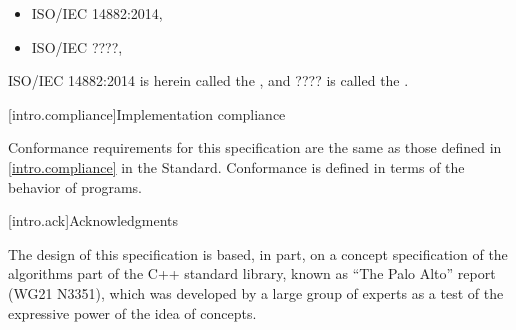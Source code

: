 \begin{itemize}
\item ISO/IEC 14882:2014, 
\item ISO/IEC ????, 
\end{itemize}

ISO/IEC 14882:2014 is herein called the , and
???? is called the .

[intro.compliance]{Implementation compliance}

\pnum
Conformance requirements for this specification are the same as those
defined in \ref{intro.compliance} in the \Cpp Standard.
\enternote
Conformance is defined in terms of the behavior of programs.
\exitnote

[intro.ack]{Acknowledgments}

\pnum
The design of this specification is based, in part, on a concept
specification of the algorithms part of the C++ standard library, known
as ``The Palo Alto'' report (WG21 N3351), which was developed by a large
group of experts as a test of the expressive power of the idea of
concepts.
